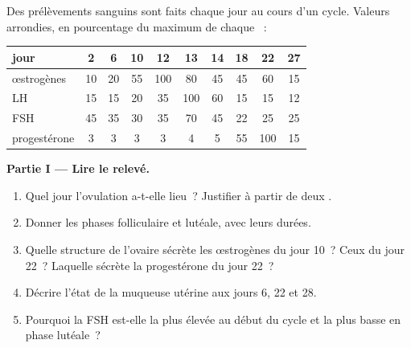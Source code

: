 \begin{problem}
\label{pb:g11:hormones-and-reproduction:1}
Des prélèvements sanguins sont faits chaque jour au cours d'un cycle.
Valeurs arrondies, en pourcentage du maximum de chaque ~:

\begin{center}
\begin{tabular}{lccccccccc}
jour & 2 & 6 & 10 & 12 & 13 & 14 & 18 & 22 & 27 \\ \hline
œstrogènes & 10 & 20 & 55 & 100 & 80 & 45 & 45 & 60 & 15 \\
LH & 15 & 15 & 20 & 35 & 100 & 60 & 15 & 15 & 12 \\
FSH & 45 & 35 & 30 & 35 & 70 & 45 & 22 & 25 & 25 \\
progestérone & 3 & 3 & 3 & 3 & 4 & 5 & 55 & 100 & 15 \\
\end{tabular}
\end{center}

\medskip
\noindent\textbf{Partie I --- Lire le relevé.}
\begin{enumerate}
  \item Quel jour l'ovulation a-t-elle lieu~? Justifier à partir de
        deux .
  \item Donner les phases folliculaire et lutéale, avec leurs durées.
  \item Quelle structure de l'ovaire sécrète les œstrogènes du jour
        10~? Ceux du jour 22~? Laquelle sécrète la progestérone du jour
        22~?
  \item Décrire l'état de la muqueuse utérine aux jours 6, 22 et 28.
  \item Pourquoi la FSH est-elle la plus élevée au début du cycle et la
        plus basse en phase lutéale~?
\end{enumerate}


\end{problem}
